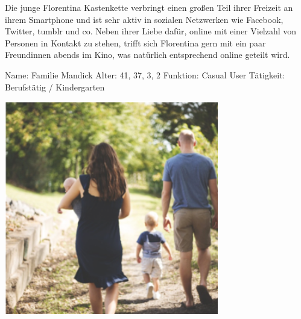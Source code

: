 Die junge Florentina Kastenkette verbringt einen großen Teil ihrer Freizeit an ihrem Smartphone und ist sehr aktiv in sozialen Netzwerken wie Facebook, Twitter, tumblr und co. Neben ihrer Liebe dafür, online mit einer Vielzahl von Personen in Kontakt zu stehen, trifft sich Florentina gern mit ein paar Freundinnen abends im Kino, was natürlich entsprechend online geteilt wird.

\newpage
{}
\begin{minipage}[t]{0.5\textwidth} 	\vspace{0.0\baselineskip} %
	\begin{entrylist}
		\entry
		{Name:}
		{Familie Mandick}
		\entry
		{Alter:}
		{41, 37, 3, 2}
		\entry
		{Funktion:}
		{Casual User}
		\entry
		{Tätigkeit:}
		{Berufstätig / Kindergarten}
	\end{entrylist}
	\begin{barchart}{5.0}\hspace{-1.5mm}
	\end{barchart}
\end{minipage}
\hfil
\begin{minipage}[t]{0.4\textwidth} 	\vspace{0.0\baselineskip} %
	\flushright
	\includegraphics[width=0.70\textwidth]{img/mandick}
\end{minipage}

